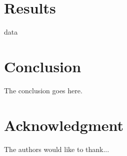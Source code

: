 \documentclass[conference]{IEEEtran}
\begin{document}
\section{Results}
data

\section{Conclusion}
The conclusion goes here.

\section*{Acknowledgment}

The authors would like to thank...

\nocite{*}


\end{document}

